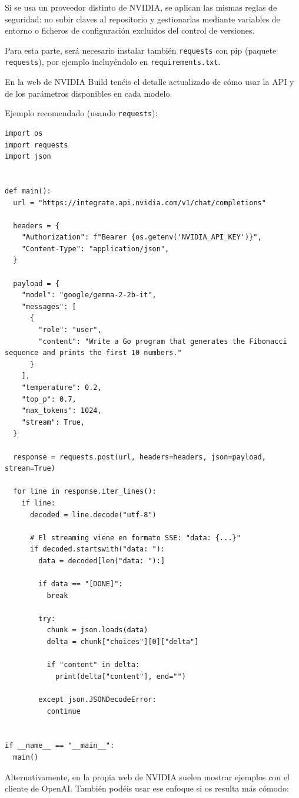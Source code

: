 Si se usa un proveedor distinto de NVIDIA, se aplican las mismas reglas de seguridad: no subir claves al repositorio y gestionarlas mediante variables de entorno o ficheros de configuración excluidos del control de versiones.

Para esta parte, será necesario instalar también \verb|requests| con pip (paquete \verb|requests|), por ejemplo incluyéndolo en \verb|requirements.txt|.

En la web de NVIDIA Build tenéis el detalle actualizado de cómo usar la API y de los parámetros disponibles en cada modelo.

Ejemplo recomendado (usando \verb|requests|):

\begin{verbatim}
import os
import requests
import json


def main():
  url = "https://integrate.api.nvidia.com/v1/chat/completions"

  headers = {
    "Authorization": f"Bearer {os.getenv('NVIDIA_API_KEY')}",
    "Content-Type": "application/json",
  }

  payload = {
    "model": "google/gemma-2-2b-it",
    "messages": [
      {
        "role": "user",
        "content": "Write a Go program that generates the Fibonacci sequence and prints the first 10 numbers."
      }
    ],
    "temperature": 0.2,
    "top_p": 0.7,
    "max_tokens": 1024,
    "stream": True,
  }

  response = requests.post(url, headers=headers, json=payload, stream=True)

  for line in response.iter_lines():
    if line:
      decoded = line.decode("utf-8")

      # El streaming viene en formato SSE: "data: {...}"
      if decoded.startswith("data: "):
        data = decoded[len("data: "):]

        if data == "[DONE]":
          break

        try:
          chunk = json.loads(data)
          delta = chunk["choices"][0]["delta"]

          if "content" in delta:
            print(delta["content"], end="")

        except json.JSONDecodeError:
          continue


if __name__ == "__main__":
  main()
\end{verbatim}

Alternativamente, en la propia web de NVIDIA suelen mostrar ejemplos con el cliente de OpenAI. También podéis usar ese enfoque si os resulta más cómodo:


